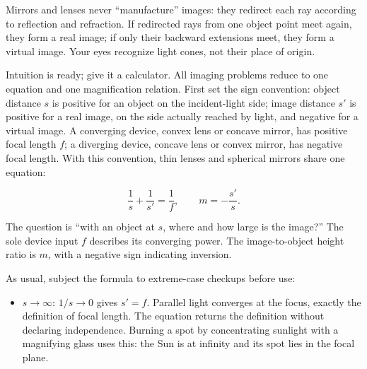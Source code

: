 \begin{mainline}


\begin{oneline}
Mirrors and lenses never ``manufacture'' images: they redirect each ray according to reflection and refraction. If redirected rays from one object point meet again, they form a real image; if only their backward extensions meet, they form a virtual image. Your eyes recognize light cones, not their place of origin.
\end{oneline}


Intuition is ready; give it a calculator. All imaging problems reduce to one equation and one magnification relation. First set the sign convention: object distance $s$ is positive for an object on the incident-light side; image distance $s'$ is positive for a real image, on the side actually reached by light, and negative for a virtual image. A converging device, convex lens or concave mirror, has positive focal length $f$; a diverging device, concave lens or convex mirror, has negative focal length. With this convention, thin lenses and spherical mirrors share one equation:

\[
\frac{1}{s}+\frac{1}{s'}=\frac{1}{f},
\qquad
m=-\frac{s'}{s}.
\]

The question is ``with an object at $s$, where and how large is the image?'' The sole device input $f$ describes its converging power. The image-to-object height ratio is $m$, with a negative sign indicating inversion.

As usual, subject the formula to extreme-case checkups before use:

\begin{itemize}
  \item \textbf{$s\to\infty$}: $1/s\to0$ gives $s'=f$. Parallel light converges at the focus, exactly the definition of focal length. The equation returns the definition without declaring independence. Burning a spot by concentrating sunlight with a magnifying glass uses this: the Sun is at infinity and its spot lies in the focal plane.


\end{itemize}
\end{mainline}
